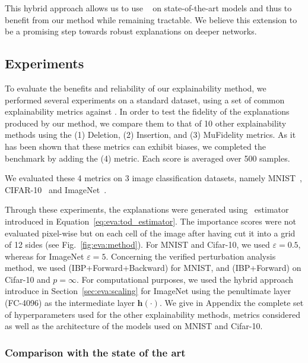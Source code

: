 This hybrid approach allows us to use \eva~ on state-of-the-art models and thus to benefit from our method while remaining tractable. We believe this extension to be a promising step towards robust explanations on deeper networks.

\subsection{Experiments}
\label{sec:eva:experiments}



To evaluate the benefits and reliability of our explainability method, we performed several experiments on a standard dataset, using a set of common explainability metrics against \eva.
In order to test the fidelity of the explanations produced by our method, we compare them to that of 10 other explainability methods using the (1) Deletion, (2) Insertion, and (3) MuFidelity metrics. As it has been shown that these metrics can exhibit biases, we completed the benchmark by adding the (4) \rsr metric. Each score is averaged over 500 samples.

We evaluated these 4 metrics on 3 image classification datasets, namely MNIST~\cite{lecun2010mnist}, CIFAR-10~\cite{krizhevsky2009learning} and ImageNet~\cite{imagenet_cvpr09}.

Through these experiments, the explanations were generated using \eva~estimator introduced in Equation~\ref{eq:eva:tod_estimator}. The importance scores were not evaluated pixel-wise but on each cell of the image after having cut it into a grid of 12 sides (see Fig.~\ref{fig:eva:method}). For MNIST and Cifar-10, we used 
$\varepsilon = 0.5$, whereas for ImageNet $\varepsilon = 5$. Concerning the verified perturbation analysis method, we used (IBP+Forward+Backward) for MNIST, and (IBP+Forward) on Cifar-10 and $p=\infty$. For computational purposes, we used the hybrid approach introduce in Section~\ref{sec:eva:scaling} for ImageNet using the penultimate layer (FC-4096) as the intermediate layer $\bm{h}(\cdot)$. We give in Appendix the complete set of hyperparameters used for the other explainability methods, metrics considered as well as the architecture of the models used on MNIST and Cifar-10.

\subsubsection{Comparison with the state of the art}


